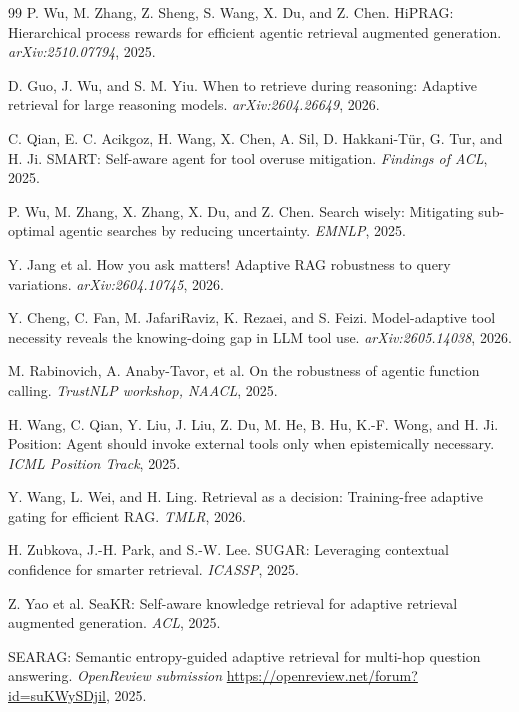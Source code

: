 \documentclass[10pt,letterpaper]{article}
\begin{document}
\begin{thebibliography}{99}
P. Wu, M. Zhang, Z. Sheng, S. Wang, X. Du, and Z. Chen.
{HiPRAG}: Hierarchical process rewards for efficient agentic retrieval augmented generation.
\emph{arXiv:2510.07794}, 2025.

D. Guo, J. Wu, and S. M. Yiu.
When to retrieve during reasoning: Adaptive retrieval for large reasoning models.
\emph{arXiv:2604.26649}, 2026.

C. Qian, E. C. Acikgoz, H. Wang, X. Chen, A. Sil, D. Hakkani-T\"ur, G. Tur, and H. Ji.
{SMART}: Self-aware agent for tool overuse mitigation.
\emph{Findings of ACL}, 2025.

P. Wu, M. Zhang, X. Zhang, X. Du, and Z. Chen.
Search wisely: Mitigating sub-optimal agentic searches by reducing uncertainty.
\emph{EMNLP}, 2025.

Y. Jang et al.
How you ask matters! {A}daptive {RAG} robustness to query variations.
\emph{arXiv:2604.10745}, 2026.

Y. Cheng, C. Fan, M. JafariRaviz, K. Rezaei, and S. Feizi.
Model-adaptive tool necessity reveals the knowing-doing gap in {LLM} tool use.
\emph{arXiv:2605.14038}, 2026.

M. Rabinovich, A. Anaby-Tavor, et al.
On the robustness of agentic function calling.
\emph{TrustNLP workshop, NAACL}, 2025.

H. Wang, C. Qian, Y. Liu, J. Liu, Z. Du, M. He, B. Hu, K.-F. Wong, and H. Ji.
Position: Agent should invoke external tools only when epistemically necessary.
\emph{ICML Position Track}, 2025.

Y. Wang, L. Wei, and H. Ling.
Retrieval as a decision: Training-free adaptive gating for efficient {RAG}.
\emph{TMLR}, 2026.

H. Zubkova, J.-H. Park, and S.-W. Lee.
{SUGAR}: Leveraging contextual confidence for smarter retrieval.
\emph{ICASSP}, 2025.

Z. Yao et al.
{SeaKR}: Self-aware knowledge retrieval for adaptive retrieval augmented generation.
\emph{ACL}, 2025.

{SEARAG}: Semantic entropy-guided adaptive retrieval for multi-hop question answering.
\emph{OpenReview submission} \url{https://openreview.net/forum?id=suKWySDjil}, 2025.


\end{thebibliography}
\end{document}
